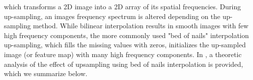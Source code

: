 \documentclass[letterpaper]{article} %
\begin{document}
which transforms a 2D image into a 2D array of its spatial frequencies. During up-sampling, an images frequency spectrum is altered depending on the up-sampling method. While bilinear interpolation results in smooth images with few high frequency components, the more commonly used "bed of nails" interpolation up-sampling, which fills the missing values with zeros, initializes the up-sampled image (or feature map) with many high frequency components. In \cite{margret2020upconvolution}, a theoretic analysis of the effect of upsampling using bed of nails interpolation is provided, which we summarize below.
\end{document}
